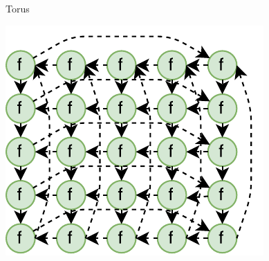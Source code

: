 \begin{frame}[fragile]{Torus}
\begin{center}
\includegraphics[scale=0.8]{images/torus.pdf}
\end{center}
\end{frame}